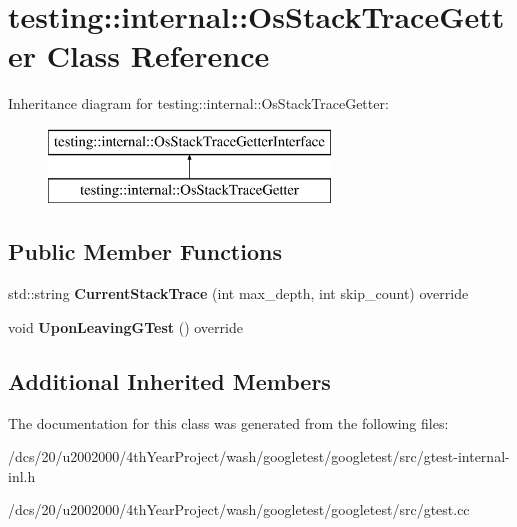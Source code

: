\hypertarget{classtesting_1_1internal_1_1OsStackTraceGetter}{}\section{testing\+:\+:internal\+:\+:Os\+Stack\+Trace\+Getter Class Reference}
\label{classtesting_1_1internal_1_1OsStackTraceGetter}
Inheritance diagram for testing\+:\+:internal\+:\+:Os\+Stack\+Trace\+Getter\+:\begin{figure}[H]
\begin{center}
\leavevmode
\includegraphics[height=2.000000cm]{classtesting_1_1internal_1_1OsStackTraceGetter}
\end{center}
\end{figure}
\subsection*{Public Member Functions}
\begin{DoxyCompactItemize}
\item 
\mbox{\label{classtesting_1_1internal_1_1OsStackTraceGetter_acd831383d555bd50cc9191b0d450854a}} 
std\+::string {\bfseries Current\+Stack\+Trace} (int max\+\_\+depth, int skip\+\_\+count) override
\item 
\mbox{\label{classtesting_1_1internal_1_1OsStackTraceGetter_ac4b20f2494de8869c3a1df106c477a85}} 
void {\bfseries Upon\+Leaving\+G\+Test} () override
\end{DoxyCompactItemize}
\subsection*{Additional Inherited Members}


The documentation for this class was generated from the following files\+:\begin{DoxyCompactItemize}
\item 
/dcs/20/u2002000/4th\+Year\+Project/wash/googletest/googletest/src/gtest-\/internal-\/inl.\+h\item 
/dcs/20/u2002000/4th\+Year\+Project/wash/googletest/googletest/src/gtest.\+cc\end{DoxyCompactItemize}

